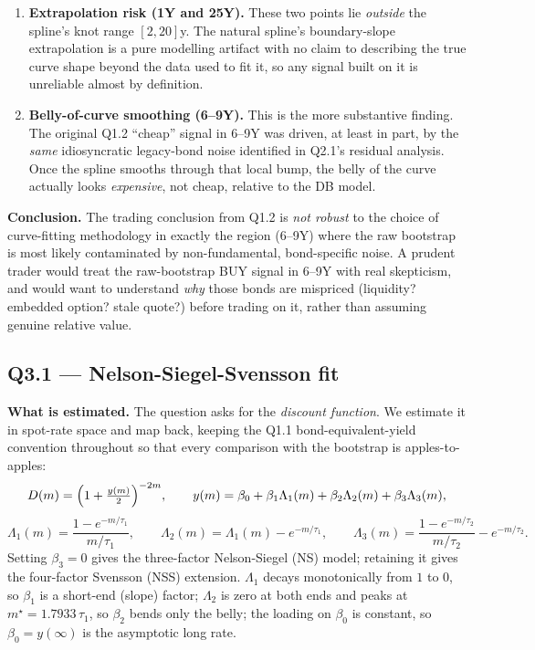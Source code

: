 \documentclass[11pt]{article}
\newcommand{\question}[1]{\subsection*{\textcolor{edhecred}{#1}}}
\begin{document}
\begin{enumerate}[leftmargin=1.4em]
\item \textbf{Extrapolation risk (1Y and 25Y).} These two points lie
\emph{outside} the spline's knot range $[2,20]$y. The natural spline's
boundary-slope extrapolation is a pure modelling artifact with no claim to
describing the true curve shape beyond the data used to fit it, so any
signal built on it is unreliable almost by definition.
\item \textbf{Belly-of-curve smoothing (6--9Y).} This is the more
substantive finding. The original Q1.2 ``cheap'' signal in 6--9Y was driven,
at least in part, by the \emph{same} idiosyncratic legacy-bond noise
identified in Q2.1's residual analysis. Once the spline smooths through
that local bump, the belly of the curve actually looks \emph{expensive}, not
cheap, relative to the DB model.
\end{enumerate}

\textbf{Conclusion.} The trading conclusion from Q1.2 is \emph{not robust}
to the choice of curve-fitting methodology in exactly the region (6--9Y)
where the raw bootstrap is most likely contaminated by non-fundamental,
bond-specific noise. A prudent trader would treat the raw-bootstrap BUY
signal in 6--9Y with real skepticism, and would want to understand
\emph{why} those bonds are mispriced (liquidity? embedded option? stale
quote?) before trading on it, rather than assuming genuine relative value.


\question{Q3.1 --- Nelson-Siegel-Svensson fit}
 
\textbf{What is estimated.} The question asks for the \emph{discount function}. We estimate it in
spot-rate space and map back, keeping the Q1.1 bond-equivalent-yield convention throughout so that
every comparison with the bootstrap is apples-to-apples:
\[
  D(m)=\Bigl(1+\tfrac{y(m)}{2}\Bigr)^{-2m},
  \qquad
  y(m)=\beta_0+\beta_1\Lambda_1(m)+\beta_2\Lambda_2(m)+\beta_3\Lambda_3(m),
\]
\[
  \Lambda_1(m)=\frac{1-e^{-m/\tau_1}}{m/\tau_1},
  \qquad
  \Lambda_2(m)=\Lambda_1(m)-e^{-m/\tau_1},
  \qquad
  \Lambda_3(m)=\frac{1-e^{-m/\tau_2}}{m/\tau_2}-e^{-m/\tau_2}.
\]
Setting $\beta_3=0$ gives the three-factor Nelson-Siegel (NS) model; retaining it gives the
four-factor Svensson (NSS) extension. $\Lambda_1$ decays monotonically from $1$ to $0$, so $\beta_1$
is a short-end (slope) factor; $\Lambda_2$ is zero at both ends and peaks at $m^\star=1.7933\,\tau_1$,
so $\beta_2$ bends only the belly; the loading on $\beta_0$ is constant, so $\beta_0=y(\infty)$ is the
asymptotic long rate.
 
\end{document}

